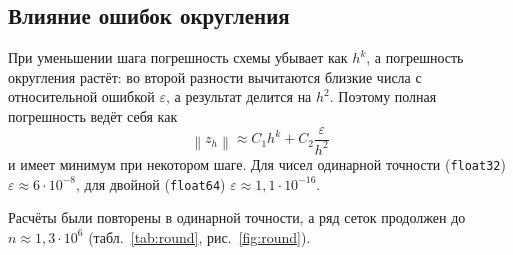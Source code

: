 \documentclass[12pt,a4paper]{article}
\newcommand{\norm}[1]{\left\lVert #1\right\rVert}
\begin{document}
\subsection{Влияние ошибок округления}\label{sec:round}

При уменьшении шага погрешность схемы убывает как $h^k$, а погрешность
округления растёт: во второй разности вычитаются близкие числа с
относительной ошибкой $\varepsilon$, а результат делится на $h^2$.
Поэтому полная погрешность ведёт себя как
\[
\norm{z_h}\approx C_1h^k + C_2\frac{\varepsilon}{h^2}
\]
и имеет минимум при некотором шаге. Для чисел одинарной точности
(\texttt{float32}) $\varepsilon\approx 6\cdot10^{-8}$, для двойной
(\texttt{float64}) $\varepsilon\approx 1{,}1\cdot10^{-16}$.

Расчёты были повторены в одинарной точности, а ряд сеток продолжен до
$n\approx1{,}3\cdot10^6$ (табл.~\ref{tab:round}, рис.~\ref{fig:round}).
\end{document}
